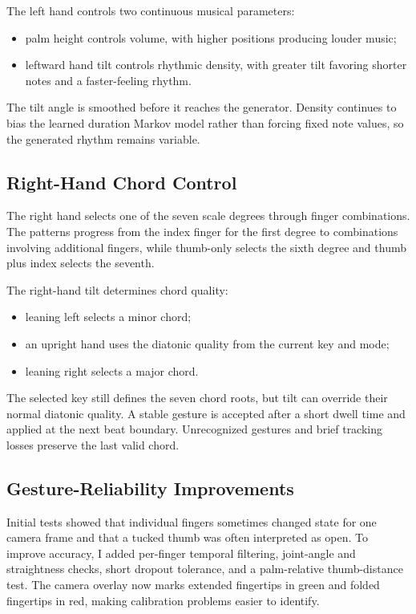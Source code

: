 \documentclass[11pt,a4paper]{article}
\begin{document}
The left hand controls two continuous musical parameters:

\begin{itemize}
    \item palm height controls volume, with higher positions producing louder
    music;
    \item leftward hand tilt controls rhythmic density, with greater tilt
    favoring shorter notes and a faster-feeling rhythm.
\end{itemize}

The tilt angle is smoothed before it reaches the generator. Density continues
to bias the learned duration Markov model rather than forcing fixed note
values, so the generated rhythm remains variable.

\subsection{Right-Hand Chord Control}

The right hand selects one of the seven scale degrees through finger
combinations. The patterns progress from the index finger for the first degree
to combinations involving additional fingers, while thumb-only selects the
sixth degree and thumb plus index selects the seventh.

The right-hand tilt determines chord quality:

\begin{itemize}
    \item leaning left selects a minor chord;
    \item an upright hand uses the diatonic quality from the current key and
    mode;
    \item leaning right selects a major chord.
\end{itemize}

The selected key still defines the seven chord roots, but tilt can override
their normal diatonic quality. A stable gesture is accepted after a short dwell
time and applied at the next beat boundary. Unrecognized gestures and brief
tracking losses preserve the last valid chord.

\subsection{Gesture-Reliability Improvements}

Initial tests showed that individual fingers sometimes changed state for one
camera frame and that a tucked thumb was often interpreted as open. To improve
accuracy, I added per-finger temporal filtering, joint-angle and straightness
checks, short dropout tolerance, and a palm-relative thumb-distance test. The
camera overlay now marks extended fingertips in green and folded fingertips in
red, making calibration problems easier to identify.
\end{document}

